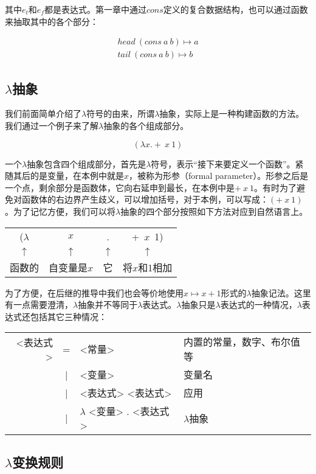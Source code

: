 \documentclass[UTF8]{article}
\begin{document}
其中$e_t$和$e_f$都是表达式。第一章中通过$cons$定义的复合数据结构，也可以通过函数来抽取其中的各个部分：

\[
\begin{array}{l}
head\ (cons\ a\ b) \mapsto a \\
tail\ (cons\ a\ b) \mapsto b
\end{array}
\]

\subsection{$\lambda$抽象}

我们前面简单介绍了$\lambda$符号的由来，所谓$\lambda$抽象，实际上是一种构建函数的方法。我们通过一个例子来了解$\lambda$抽象的各个组成部分。

\[
(\lambda x . +\ x\ 1)
\]

一个$\lambda$抽象包含四个组成部分，首先是$\lambda$符号，表示“接下来要定义一个函数”。紧随其后的是变量，在本例中就是$x$，被称为形参（formal parameter）。形参之后是一个点，剩余部分是函数体，它向右延申到最长，在本例中是$+\ x\ 1$。有时为了避免对函数体的右边界产生歧义，可以增加括号，对于本例，可以写成：$(+\ x\ 1)$。为了记忆方便，我们可以将$\lambda$抽象的四个部分按照如下方法对应到自然语言上。

\begin{tabular}{cccc}
($\lambda$ & $x$ & . & +\  $x$\ 1) \\
$\uparrow$ & $\uparrow$ & $\uparrow$ & $\uparrow$ \\
函数的 & 自变量是$x$ & 它 & 将$x$和1相加 \\
\end{tabular}

为了方便，在后继的推导中我们也会等价地使用$x \mapsto x + 1$形式的$\lambda$抽象记法。这里有一点需要澄清，$\lambda$抽象并不等同于$\lambda$表达式。$\lambda$抽象只是$\lambda$表达式的一种情况，$\lambda$表达式还包括其它三种情况：

\begin{tabular}{rcll}
<表达式> & = & <常量> & 内置的常量，数字、布尔值等 \\
        & | & <变量> & 变量名 \\
        & | & <表达式> <表达式> & 应用 \\
        & | & $\lambda$ <变量> . <表达式> & $\lambda$抽象
\end{tabular}

\subsection{$\lambda$变换规则}
\end{document}
